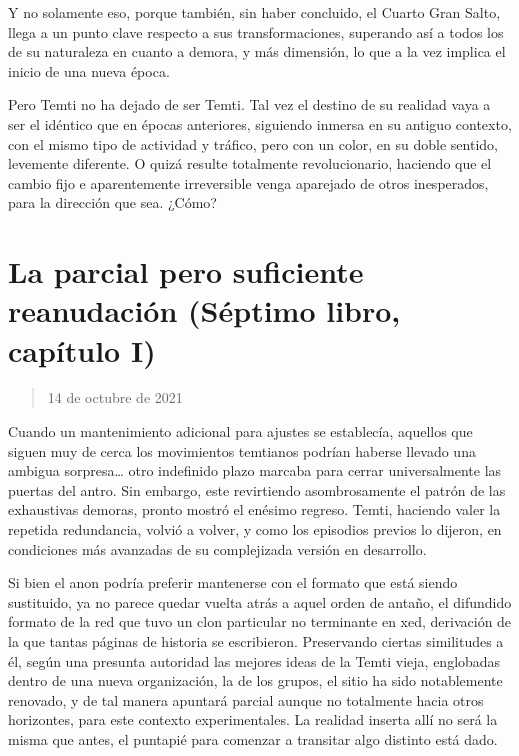 \documentclass[
]{book}
\begin{document}
Y no solamente eso, porque también, sin haber concluido, el Cuarto Gran Salto, llega a un punto clave respecto a sus transformaciones, superando así a todos los de su naturaleza en cuanto a demora, y más dimensión, lo que a la vez implica el inicio de una nueva época.

Pero Temti no ha dejado de ser Temti. Tal vez el destino de su realidad vaya a ser el idéntico que en épocas anteriores, siguiendo inmersa en su antiguo contexto, con el mismo tipo de actividad y tráfico, pero con un color, en su doble sentido, levemente diferente. O quizá resulte totalmente revolucionario, haciendo que el cambio fijo e aparentemente irreversible venga aparejado de otros inesperados, para la dirección que sea. ¿Cómo?

\hypertarget{la-parcial-pero-suficiente-reanudaciuxf3n-suxe9ptimo-libro-capuxedtulo-i}{%
\section{La parcial pero suficiente reanudación (Séptimo libro, capítulo I)}\label{la-parcial-pero-suficiente-reanudaciuxf3n-suxe9ptimo-libro-capuxedtulo-i}}

\begin{quote}
14 de octubre de 2021
\end{quote}

Cuando un mantenimiento adicional para ajustes se establecía, aquellos que siguen muy de cerca los movimientos temtianos podrían haberse llevado una ambigua sorpresa\ldots{} otro indefinido plazo marcaba para cerrar universalmente las puertas del antro. Sin embargo, este revirtiendo asombrosamente el patrón de las exhaustivas demoras, pronto mostró el enésimo regreso. Temti, haciendo valer la repetida redundancia, volvió a volver, y como los episodios previos lo dijeron, en condiciones más avanzadas de su complejizada versión en desarrollo.

Si bien el anon podría preferir mantenerse con el formato que está siendo sustituido, ya no parece quedar vuelta atrás a aquel orden de antaño, el difundido formato de la red que tuvo un clon particular no terminante en xed, derivación de la que tantas páginas de historia se escribieron. Preservando ciertas similitudes a él, según una presunta autoridad las mejores ideas de la Temti vieja, englobadas dentro de una nueva organización, la de los grupos, el sitio ha sido notablemente renovado, y de tal manera apuntará parcial aunque no totalmente hacia otros horizontes, para este contexto experimentales. La realidad inserta allí no será la misma que antes, el puntapié para comenzar a transitar algo distinto está dado.
\end{document}
